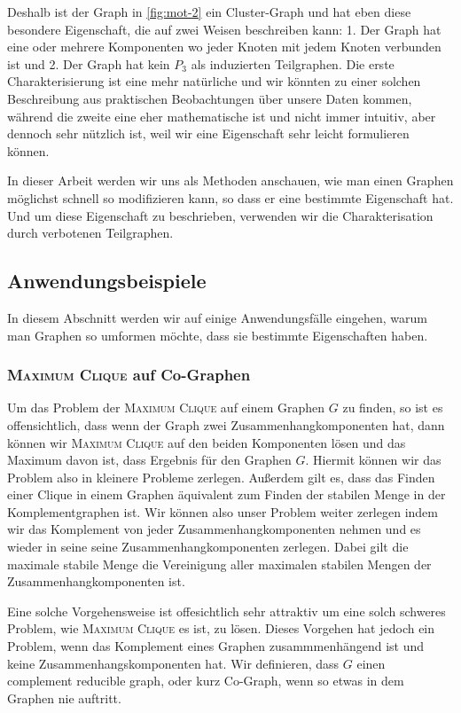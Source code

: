\documentclass[12pt,a4paper,onecolumn,oneside,titlepage]{article}
\begin{document}
Deshalb ist der Graph in \ref{fig:mot-2} ein Cluster-Graph und hat eben diese besondere Eigenschaft, die auf zwei Weisen beschreiben kann: 1. Der Graph hat eine oder mehrere Komponenten wo jeder Knoten mit jedem Knoten verbunden ist und 2. Der Graph hat kein $P_3$ als induzierten Teilgraphen. Die erste Charakterisierung ist eine mehr natürliche und wir könnten zu einer solchen Beschreibung aus praktischen Beobachtungen über unsere Daten kommen, während die zweite eine eher mathematische ist und nicht immer intuitiv, aber dennoch sehr nützlich ist, weil wir eine Eigenschaft sehr leicht formulieren können.

In dieser Arbeit werden wir uns als Methoden anschauen, wie man einen Graphen möglichst schnell so modifizieren kann, so dass er eine bestimmte Eigenschaft hat. Und um diese Eigenschaft zu beschrieben, verwenden wir die Charakterisation durch verbotenen Teilgraphen. 
 

\subsection{Anwendungsbeispiele}
\label{sec:examples}
In diesem Abschnitt werden wir auf einige Anwendungsfälle eingehen, warum man Graphen so umformen möchte, dass sie bestimmte Eigenschaften haben.
\subsubsection{\textsc{Maximum Clique} auf Co-Graphen}
Um das Problem der \textsc{Maximum Clique} auf einem Graphen $G$ zu finden, so ist es offensichtlich, dass wenn der Graph zwei Zusammenhangkomponenten hat, dann können wir 
\textsc{Maximum Clique} auf den beiden Komponenten lösen und das Maximum davon ist, dass Ergebnis für den Graphen $G$. Hiermit können wir das Problem also in kleinere Probleme zerlegen.
Außerdem gilt es, dass das Finden einer Clique in einem Graphen äquivalent zum Finden der stabilen Menge in der Komplementgraphen ist.
Wir können also unser Problem weiter zerlegen indem wir das Komplement von jeder Zusammenhangkomponenten nehmen und es wieder in seine seine Zusammenhangkomponenten zerlegen. Dabei gilt die maximale stabile Menge die Vereinigung aller maximalen stabilen Mengen der Zusammenhangkomponenten ist.

Eine solche Vorgehensweise ist offesichtlich sehr attraktiv um eine solch schweres Problem, wie \textsc{Maximum Clique} es ist, zu lösen. Dieses Vorgehen hat jedoch ein Problem, wenn das Komplement eines Graphen zusammmenhängend ist und keine Zusammenhangskomponenten hat. Wir definieren, dass $G$ einen complement reducible graph, oder kurz Co-Graph, wenn so etwas in dem Graphen nie auftritt.\cite{Nastos06}
\end{document}
